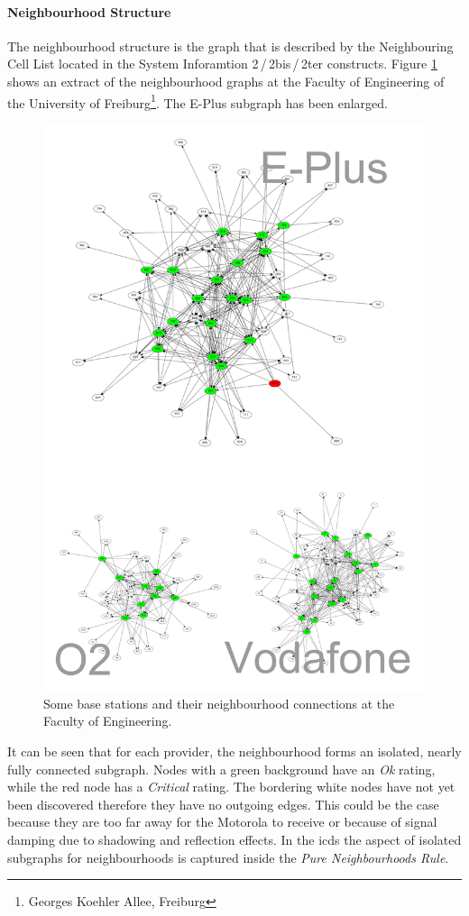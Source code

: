 \paragraph{Neighbourhood Structure}
The neighbourhood structure is the graph that is described by the Neighbouring Cell List located in the System Inforamtion 2\,/\,2bis\,/\,2ter constructs.
Figure \ref{fig:neighbourhood_example} shows an extract of the neighbourhood graphs at the Faculty of Engineering of the University of Freiburg\footnote{Georges Koehler Allee, Freiburg}.
The E-Plus subgraph has been enlarged.
\begin{figure}
\centering
\includegraphics[width=.9\textwidth]{../Images/neighbourhoods_fak}
\caption{Some base stations and their neighbourhood connections at the Faculty of Engineering.}
\label{fig:neighbourhood_example}
\end{figure}
It can be seen that for each provider, the neighbourhood forms an isolated, nearly fully connected subgraph.
Nodes with a green background have an \emph{Ok} rating, while the red node has a \emph{Critical} rating.
The bordering white nodes have not yet been discovered therefore they have no outgoing edges.
This could be the case because they are too far away for the Motorola to receive or because of signal damping due to shadowing and reflection effects.
In the \gls{icds} the aspect of isolated subgraphs for neighbourhoods is captured inside the \emph{Pure Neighbourhoods Rule}.

